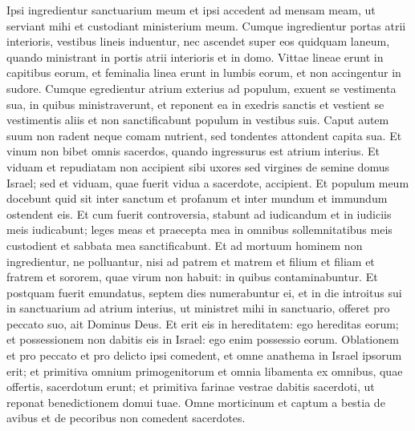 \begin{biblechapter}
\verse Ipsi ingredientur sanctuarium meum et ipsi accedent ad mensam meam, ut serviant mihi et custodiant ministerium meum. 
\verse Cumque ingredientur portas atrii interioris, vestibus lineis induentur, nec ascendet super eos quidquam laneum, quando ministrant in portis atrii interioris et in domo. 
\verse Vittae lineae erunt in capitibus eorum, et feminalia linea erunt in lumbis eorum, et non accingentur in sudore. 
\verse Cumque egredientur atrium exterius ad populum, exuent se vestimenta sua, in quibus ministraverunt, et reponent ea in exedris sanctis et vestient se vestimentis aliis et non sanctificabunt populum in vestibus suis. 
\verse Caput autem suum non radent neque comam nutrient, sed tondentes attondent capita sua. 
\verse Et vinum non bibet omnis sacerdos, quando ingressurus est atrium interius. 
\verse Et viduam et repudiatam non accipient sibi uxores sed virgines de semine domus Israel; sed et viduam, quae fuerit vidua a sacerdote, accipient. 
\verse Et populum meum docebunt quid sit inter sanctum et profanum et inter mundum et immundum ostendent eis. 
\verse Et cum fuerit controversia, stabunt ad iudicandum et in iudiciis meis iudicabunt; leges meas et praecepta mea in omnibus sollemnitatibus meis custodient et sabbata mea sanctificabunt. 
\verse Et ad mortuum hominem non ingredientur, ne polluantur, nisi ad patrem et matrem et filium et filiam et fratrem et sororem, quae virum non habuit: in quibus contaminabuntur. 
\verse Et postquam fuerit emundatus, septem dies numerabuntur ei, 
\verse et in die introitus sui in sanctuarium ad atrium interius, ut ministret mihi in sanctuario, offeret pro peccato suo, ait Dominus Deus. 
\verse Et erit eis in hereditatem: ego hereditas eorum; et possessionem non dabitis eis in Israel: ego enim possessio eorum. 
\verse Oblationem et pro peccato et pro delicto ipsi comedent, et omne anathema in Israel ipsorum erit; 
\verse et primitiva omnium primogenitorum et omnia libamenta ex omnibus, quae offertis, sacerdotum erunt; et primitiva farinae vestrae dabitis sacerdoti, ut reponat benedictionem domui tuae. 
\verse Omne morticinum et captum a bestia de avibus et de pecoribus non comedent sacerdotes. 
\end{biblechapter}

